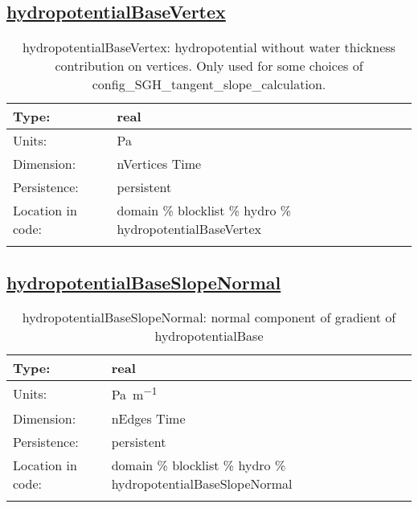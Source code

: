 \subsection[hydropotentialBaseVertex]{\hyperref[sec:var_tab_hydro]{hydropotentialBaseVertex}}
\label{subsec:var_sec_hydro_hydropotentialBaseVertex}
\begin{center}
\begin{longtable}{| p{2.0in} | p{4.0in} |}
        \hline 
        Type: & real \\
        \hline 
        Units: & \si{Pa} \\
        \hline 
        Dimension: & nVertices Time \\
        \hline 
        Persistence: & persistent \\
        \hline 
         Location in code: & domain \% blocklist \% hydro \% hydropotentialBaseVertex \\
         \hline 
    \caption{hydropotentialBaseVertex: hydropotential without water thickness contribution on vertices.  Only used for some choices of config\_SGH\_tangent\_slope\_calculation.}
\end{longtable}
\end{center}
\subsection[hydropotentialBaseSlopeNormal]{\hyperref[sec:var_tab_hydro]{hydropotentialBaseSlopeNormal}}
\label{subsec:var_sec_hydro_hydropotentialBaseSlopeNormal}
\begin{center}
\begin{longtable}{| p{2.0in} | p{4.0in} |}
        \hline 
        Type: & real \\
        \hline 
        Units: & \si{Pa.m^{-1}} \\
        \hline 
        Dimension: & nEdges Time \\
        \hline 
        Persistence: & persistent \\
        \hline 
         Location in code: & domain \% blocklist \% hydro \% hydropotentialBaseSlopeNormal \\
         \hline 
    \caption{hydropotentialBaseSlopeNormal: normal component of gradient of hydropotentialBase}
\end{longtable}
\end{center}
